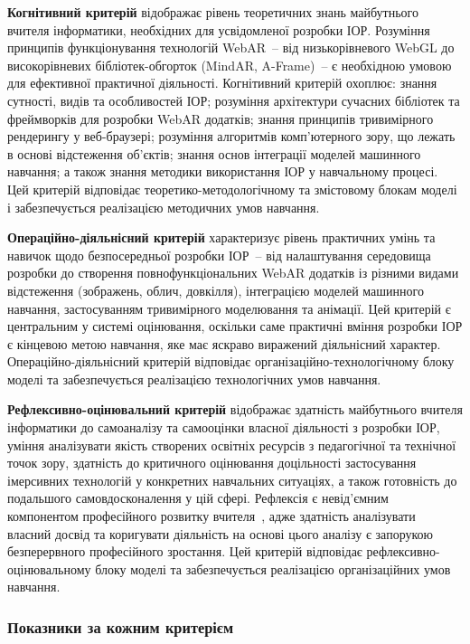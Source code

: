 \textbf{Когнітивний критерій} відображає рівень теоретичних знань майбутнього вчителя інформатики, необхідних для усвідомленої розробки ІОР. Розуміння принципів функціонування технологій WebAR~-- від низькорівневого WebGL до високорівневих бібліотек-обгорток (MindAR, A-Frame)~-- є необхідною умовою для ефективної практичної діяльності. Когнітивний критерій охоплює: знання сутності, видів та особливостей ІОР; розуміння архітектури сучасних бібліотек та фреймворків для розробки WebAR додатків; знання принципів тривимірного рендерингу у веб-браузері; розуміння алгоритмів комп'ютерного зору, що лежать в основі відстеження об'єктів; знання основ інтеграції моделей машинного навчання; а також знання методики використання ІОР у навчальному процесі. Цей критерій відповідає теоретико-методологічному та змістовому блокам моделі і забезпечується реалізацією методичних умов навчання.

\textbf{Операційно-діяльнісний критерій} характеризує рівень практичних умінь та навичок щодо безпосередньої розробки ІОР~-- від налаштування середовища розробки до створення повнофункціональних WebAR додатків із різними видами відстеження (зображень, облич, довкілля), інтеграцією моделей машинного навчання, застосуванням тривимірного моделювання та анімації. Цей критерій є центральним у системі оцінювання, оскільки саме практичні вміння розробки ІОР є кінцевою метою навчання, яке має яскраво виражений діяльнісний характер. Операційно-діяльнісний критерій відповідає організаційно-технологічному блоку моделі та забезпечується реалізацією технологічних умов навчання.

\textbf{Рефлексивно-оцінювальний критерій} відображає здатність майбутнього вчителя інформатики до самоаналізу та самооцінки власної діяльності з розробки ІОР, уміння аналізувати якість створених освітніх ресурсів з педагогічної та технічної точок зору, здатність до критичного оцінювання доцільності застосування імерсивних технологій у конкретних навчальних ситуаціях, а також готовність до подальшого самовдосконалення у цій сфері. Рефлексія є невід'ємним компонентом професійного розвитку вчителя~\cite{ReflexiveApproach2018}, адже здатність аналізувати власний досвід та коригувати діяльність на основі цього аналізу є запорукою безперервного професійного зростання. Цей критерій відповідає рефлексивно-оцінювальному блоку моделі та забезпечується реалізацією організаційних умов навчання.

\subsubsection{Показники за кожним критерієм}

